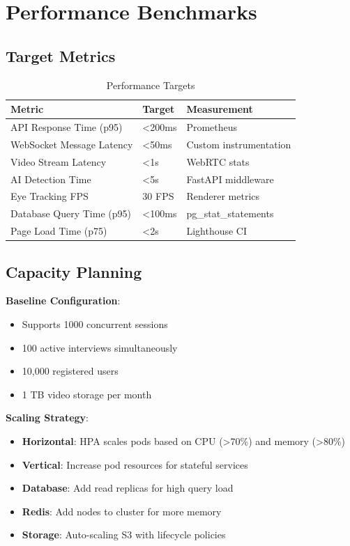 \documentclass[11pt,letterpaper]{article}
\begin{document}

\section{Performance Benchmarks}

\subsection{Target Metrics}

\begin{table}[H]
\centering
\begin{tabularx}{\textwidth}{lXl}
\toprule
\textbf{Metric} & \textbf{Target} & \textbf{Measurement} \\
\midrule
API Response Time (p95) & <200ms & Prometheus \\
WebSocket Message Latency & <50ms & Custom instrumentation \\
Video Stream Latency & <1s & WebRTC stats \\
AI Detection Time & <5s & FastAPI middleware \\
Eye Tracking FPS & 30 FPS & Renderer metrics \\
Database Query Time (p95) & <100ms & pg\_stat\_statements \\
Page Load Time (p75) & <2s & Lighthouse CI \\
\bottomrule
\end{tabularx}
\caption{Performance Targets}
\end{table}

\subsection{Capacity Planning}

\textbf{Baseline Configuration}:
\begin{itemize}[noitemsep]
    \item Supports 1000 concurrent sessions
    \item 100 active interviews simultaneously
    \item 10,000 registered users
    \item 1 TB video storage per month
\end{itemize}

\textbf{Scaling Strategy}:
\begin{itemize}[noitemsep]
    \item \textbf{Horizontal}: HPA scales pods based on CPU (>70\%) and memory (>80\%)
    \item \textbf{Vertical}: Increase pod resources for stateful services
    \item \textbf{Database}: Add read replicas for high query load
    \item \textbf{Redis}: Add nodes to cluster for more memory
    \item \textbf{Storage}: Auto-scaling S3 with lifecycle policies
\end{itemize}
\end{document}
